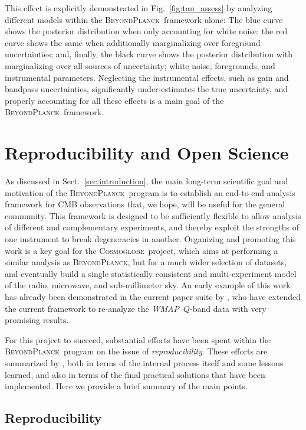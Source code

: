 \documentclass[twocolumn]{aa}
\def\WMAP{\emph{WMAP}}
\newcommand{\BP}{\textsc{BeyondPlanck}}
\newcommand{\cosmoglobe}{\textsc{Cosmoglobe}}
\begin{document}
This effect is explicitly demonstrated in Fig.~\ref{fig:tau_assess} by
analyzing different models within the \BP\ framework alone: The blue
curve shows the posterior distribution when only accounting for white
noise; the red curve shows the same when additionally marginalizing
over foreground uncertainties; and, finally, the black curve shows the
posterior distribution with marginalizing over all sources of
uncertainty; white noise, foregrounds, and instrumental
parameters. Neglecting the instrumental effects, such as gain and
bandpass uncertainties, significantly under-estimates the true
uncertainty, and properly accounting for all these effects is a main
goal of the \BP\ framework.




\section{Reproducibility and Open Science}
\label{sec:software}


As discussed in Sect.~\ref{sec:introduction}, the main long-term
scientific goal and motivation of the \BP\ program is to establish an
end-to-end analysis framework for CMB observations that, we hope, will
be useful for the general community. This framework is designed to be
sufficiently flexible to allow analysis of different and complementary
experiments, and thereby exploit the strengths of one instrument to
break degeneracies in another. Organizing and promoting this work is a
key goal for the \cosmoglobe\ project, which aims at performing a
similar analysis as \BP, but for a much wider selection of datasets,
and eventually build a single statistically consistent and
multi-experiment model of the radio, microwave, and sub-millimeter
sky. An early example of this work has already been demonstrated in
the current paper suite by \citet{bp17}, who have extended the current
framework to re-analyze the \WMAP\ $Q$-band data with very promising
results.

For this project to succeed, substantial efforts have been spent
within the \BP\ program on the issue of \emph{reproducibility}. These
efforts are summarized by \citet{bp05}, both in terms of the internal
process itself and some lessons learned, and also in terms of the
final practical solutions that have been implemented. Here we provide
a brief summary of the main points.

\subsection{Reproducibility}
\end{document}
